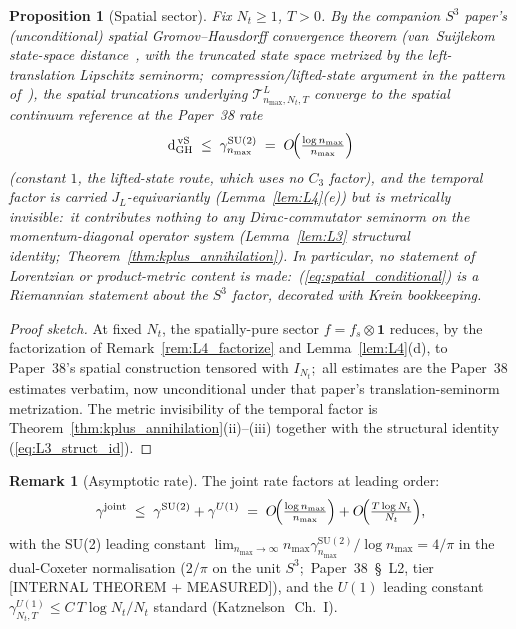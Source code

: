 \documentclass[11pt,a4paper]{article}
\theoremstyle{plain}
\newtheorem{proposition}[theorem]{Proposition}
\theoremstyle{definition}
\newtheorem{remark}[theorem]{Remark}
\newcommand{\nmax}{n_{\max}}
\newcommand{\Nt}{N_{t}}
\newcommand{\sthree}{S^{3}}
\newcommand{\Tcal}{\mathcal{T}}
\newcommand{\SU}{\mathrm{SU}}
\newcommand{\Uone}{U(1)}
\newcommand{\JL}{J_{L}}
\newcommand{\gammajoint}{\gamma^{\mathrm{joint}}}
\newcommand{\gammaSU}{\gamma^{\SU(2)}}
\newcommand{\gammaU}{\gamma^{\Uone}}
\begin{document}
\begin{proposition}[Spatial sector]
\label{prop:spatial_conditional}
Fix $\Nt \ge 1$, $T > 0$. By the companion $\sthree$ paper's
(unconditional) spatial Gromov--Hausdorff convergence theorem
(van~Suijlekom state-space distance~\cite{vs2021_jgp}, with the
truncated state space metrized by the left-translation Lipschitz
seminorm;\ compression/lifted-state argument in the pattern
of~\cite{gaudillot_vs2023}), the spatial truncations underlying
$\Tcal^{L}_{\nmax,\Nt,T}$ converge to the spatial continuum reference
at the Paper~38 rate
\begin{equation}\label{eq:spatial_conditional}
   \mathrm{d}_{\mathrm{GH}}^{\,\mathrm{vS}}
   \;\le\; \gammaSU_{\nmax}
   \;=\; O\!\Bigl(\tfrac{\log \nmax}{\nmax}\Bigr)
\end{equation}
(constant $1$, the lifted-state route, which uses no $C_{3}$ factor),
and the temporal factor is carried $\JL$-equivariantly
(Lemma~\ref{lem:L4}(e)) but is metrically invisible:\ it contributes
nothing to any Dirac-commutator seminorm on the momentum-diagonal
operator system (Lemma~\ref{lem:L3} structural identity;\
Theorem~\ref{thm:kplus_annihilation}). In particular, no statement of
Lorentzian or product-metric content is made:\
(\ref{eq:spatial_conditional}) is a Riemannian statement about the
$\sthree$ factor, decorated with Krein bookkeeping.
\end{proposition}

\begin{proof}[Proof sketch]
At fixed $\Nt$, the spatially-pure sector $f = f_{s} \otimes
\mathbf{1}$ reduces, by the factorization of
Remark~\ref{rem:L4_factorize} and Lemma~\ref{lem:L4}(d), to Paper~38's
spatial construction tensored with $I_{\Nt}$;\ all estimates are the
Paper~38 estimates verbatim, now unconditional under that paper's
translation-seminorm metrization. The metric invisibility of the
temporal factor is Theorem~\ref{thm:kplus_annihilation}(ii)--(iii)
together with the structural identity (\ref{eq:L3_struct_id}).
\qedhere
\end{proof}

\begin{remark}[Asymptotic rate]\label{rem:asymp_rate}
The joint rate factors at leading order:
\begin{equation*}
   \gammajoint \;\le\; \gammaSU + \gammaU
   \;=\; O\!\Bigl(\tfrac{\log\nmax}{\nmax}\Bigr) + O\!\Bigl(\tfrac{T\log\Nt}{\Nt}\Bigr),
\end{equation*}
with the SU(2) leading constant
$\lim_{\nmax\to\infty} \nmax \gammaSU_{\nmax} / \log\nmax = 4/\pi$ in the
dual-Coxeter normalisation ($2/\pi$ on the unit $\sthree$;\ Paper~38~\S~L2,
tier [INTERNAL THEOREM + MEASURED]), and the $\Uone$ leading constant
$\gammaU_{\Nt, T} \le C\, T \log\Nt / \Nt$ standard
(Katznelson~\cite{katznelson2004}\,Ch.~I).
\end{remark}
\end{document}
